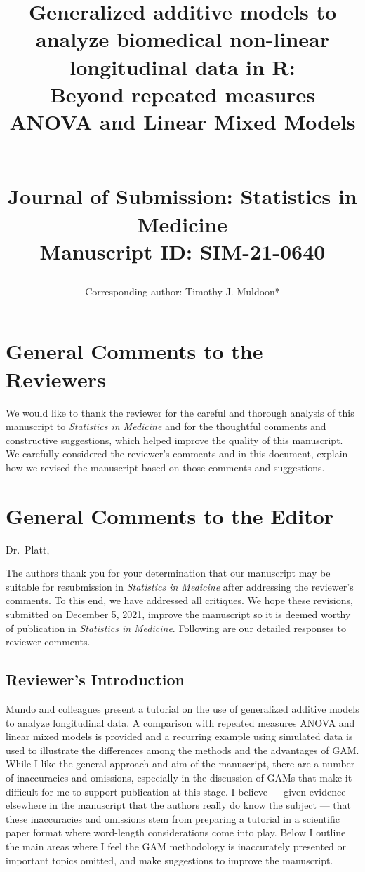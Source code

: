 \documentclass[
]{article}
\title{\textbf{Generalized additive models to analyze biomedical non-linear longitudinal data in R:}\\
Beyond repeated measures ANOVA and Linear Mixed Models\\
\strut \\
Journal of Submission: Statistics in Medicine\\
Manuscript ID: SIM-21-0640}
\author{}
\date{\vspace{-2.5em}}
\author{Corresponding author: Timothy J. Muldoon*}
\affil{Department of Biomedical Engineering, University of Arkansas, Fayetteville, AR, USA}
\affil{tmuldoon@uark.edu}
\begin{document}
\maketitle

\hypertarget{general-comments-to-the-reviewers}{%
\section{General Comments to the Reviewers}\label{general-comments-to-the-reviewers}}

We would like to thank the reviewer for the careful and thorough analysis of this manuscript to \emph{Statistics in Medicine} and for the thoughtful comments and constructive suggestions, which helped improve the quality of this manuscript. We carefully considered the reviewer's comments and in this document, explain how we revised the manuscript based on those comments and suggestions.

\hypertarget{general-comments-to-the-editor}{%
\section{General Comments to the Editor}\label{general-comments-to-the-editor}}

Dr.~Platt,

The authors thank you for your determination that our manuscript may be suitable for resubmission in \emph{Statistics in Medicine} after addressing the reviewer's comments. To this end, we have addressed all critiques. We hope these revisions, submitted on December 5, 2021, improve the manuscript so it is deemed worthy of publication in \emph{Statistics in Medicine}. Following are our detailed responses to reviewer comments.

\hypertarget{reviewers-introduction}{%
\subsection{Reviewer's Introduction}\label{reviewers-introduction}}

Mundo and colleagues present a tutorial on the use of generalized additive models to analyze longitudinal data. A comparison with repeated measures ANOVA and linear mixed models is provided and a recurring example using simulated
data is used to illustrate the differences among the methods and the advantages of GAM. While I like the general approach and aim of the manuscript, there are a number of inaccuracies and omissions, especially in the discussion of GAMs that make it difficult for me to support publication at this stage. I believe --- given evidence elsewhere in the manuscript that the authors really do know the subject --- that these inaccuracies and omissions stem from preparing a tutorial in a scientific paper format where word-length considerations come into play. Below I outline the main areas where I feel the GAM methodology is inaccurately presented or important topics omitted, and make suggestions to improve the manuscript.
\end{document}

